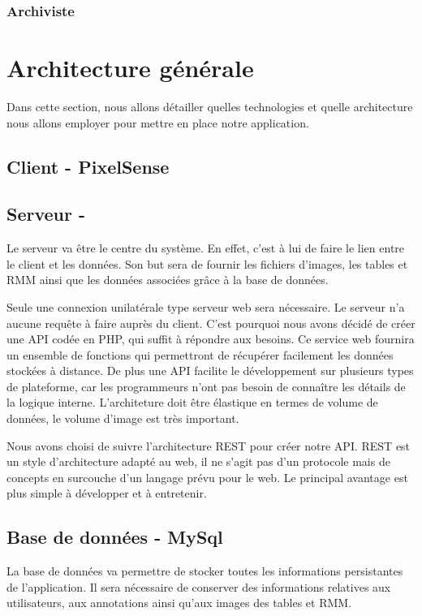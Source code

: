 \documentclass[a4paper]{article}
\begin{document}
\subsubsection{Archiviste}

\section{Architecture générale}
Dans cette section, nous allons détailler quelles technologies et quelle architecture nous allons employer pour mettre en place notre application.

\subsection{Client - PixelSense}
\subsection{Serveur - }
Le serveur va être le centre du système. En effet, c'est à lui de faire le lien entre le client et les données. Son but sera de fournir les fichiers d'images, les tables et RMM ainsi que les données associées grâce à la base de données.

Seule une connexion unilatérale type serveur web sera nécessaire. Le serveur n'a aucune requête à faire auprès du client. C'est pourquoi nous avons décidé de créer une API codée en PHP, qui suffit à répondre aux besoins. Ce service web fournira un ensemble de fonctions qui permettront de récupérer facilement les données stockées à distance. De plus une API facilite le développement sur plusieurs types de plateforme, car les programmeurs n'ont pas besoin de connaître les détails de la logique interne. L'architeture doit être élastique en termes de volume de données, le volume d'image est très important.

Nous avons choisi de suivre l'architecture REST pour créer notre API. REST est un style d'architecture adapté au web, il ne s'agit pas d'un protocole mais de concepts en surcouche d'un langage prévu pour le web. Le principal avantage est plus simple à développer et à entretenir.

\subsection{Base de données - MySql}
La base de donn\'ees va permettre de stocker toutes les informations persistantes de l'application. Il sera nécessaire de conserver des informations relatives aux utilisateurs, aux annotations ainsi qu'aux images des tables et RMM.
\end{document}
